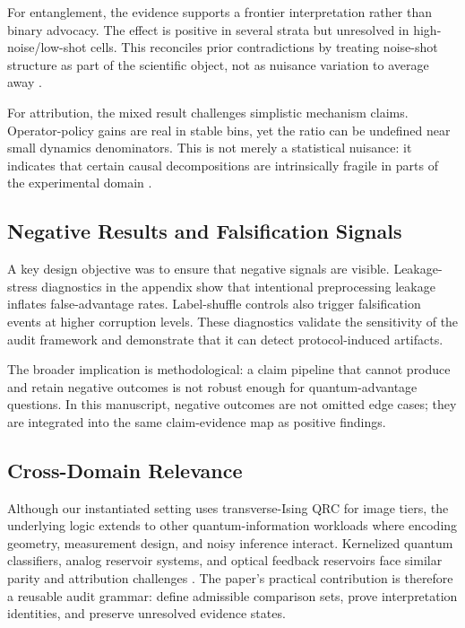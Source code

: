 \documentclass{article} %
\begin{document}
For entanglement, the evidence supports a frontier interpretation rather than binary advocacy. The effect is positive in several strata but unresolved in high-noise/low-shot cells. This reconciles prior contradictions by treating noise-shot structure as part of the scientific object, not as nuisance variation to average away \citep{arxiv_2403_08998,arxiv_2209_05142,arxiv_2509_06873,arxiv_2601_23084}.

For attribution, the mixed result challenges simplistic mechanism claims. Operator-policy gains are real in stable bins, yet the ratio can be undefined near small dynamics denominators. This is not merely a statistical nuisance: it indicates that certain causal decompositions are intrinsically fragile in parts of the experimental domain \citep{arxiv_2602_14677,arxiv_2602_18377,arxiv_2509_06873,arxiv_2601_23084}.

\subsection{Negative Results and Falsification Signals}
A key design objective was to ensure that negative signals are visible. Leakage-stress diagnostics in the appendix show that intentional preprocessing leakage inflates false-advantage rates. Label-shuffle controls also trigger falsification events at higher corruption levels. These diagnostics validate the sensitivity of the audit framework and demonstrate that it can detect protocol-induced artifacts.

The broader implication is methodological: a claim pipeline that cannot produce and retain negative outcomes is not robust enough for quantum-advantage questions. In this manuscript, negative outcomes are not omitted edge cases; they are integrated into the same claim-evidence map as positive findings.

\subsection{Cross-Domain Relevance}
Although our instantiated setting uses transverse-Ising QRC for image tiers, the underlying logic extends to other quantum-information workloads where encoding geometry, measurement design, and noisy inference interact. Kernelized quantum classifiers, analog reservoir systems, and optical feedback reservoirs face similar parity and attribution challenges \citep{arxiv_2602_19644,arxiv_2602_13531,arxiv_2407_02553,arxiv_2602_17440,arxiv_2602_19700}. The paper's practical contribution is therefore a reusable audit grammar: define admissible comparison sets, prove interpretation identities, and preserve unresolved evidence states.
\end{document}
